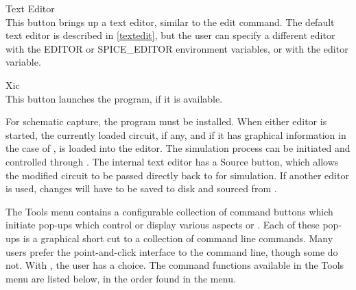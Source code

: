 \begin{description}
\item{\cb Text Editor}\\
This button brings up a text editor, similar to the {\cb edit}
command.  The default text editor is described in \ref{textedit},
but the user can specify a different editor with the {\et EDITOR} or
{\et SPICE\_EDITOR} environment variables, or with the {\et editor}
variable.

\item{\cb Xic}\\
This button launches the {\Xic} program, if it is available.
\end{description}

For schematic capture, the {\Xic} program must be installed.  When
either editor is started, the currently loaded circuit, if any, and if
it has graphical information in the case of {\Xic}, is loaded into the
editor.  The simulation process can be initiated and controlled
through {\Xic}.  The internal text editor has a {\cb Source} button,
which allows the modified circuit to be passed directly back to
{\WRspice} for simulation.  If another editor is used, changes will
have to be saved to disk and sourced from {\WRspice}.

The {\cb Tools} menu contains a configurable collection of command
buttons which initiate pop-ups which control or display various
aspects or {\WRspice}.  Each of these pop-ups is a graphical short cut
to a collection of command line commands.  Many users prefer the
point-and-click interface to the command line, though some do not. 
With {\WRspice}, the user has a choice.  The command functions
available in the {\cb Tools} menu are listed below, in the order found
in the menu.

